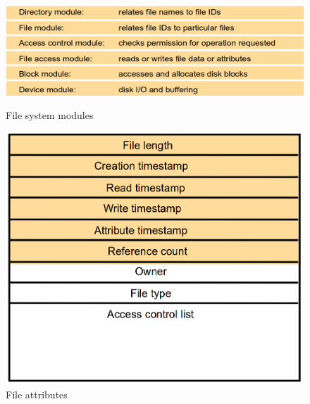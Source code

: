 \begin{figure}[!h]
	\begin{minipage}[t]{0.5\linewidth}
		\centering
		\includegraphics[width=1\textwidth]{img/fileSystemModules.png}
		\caption{File system modules}
		\label{f1}
	\end{minipage}
	\hspace{0.1cm}
	\begin{minipage}[t]{0.3\linewidth} 
		\centering
		\includegraphics[width=1\textwidth]{img/fileAttributes.png}
		\caption{File attributes}
		\label{f2}
	\end{minipage}        
\end{figure}

